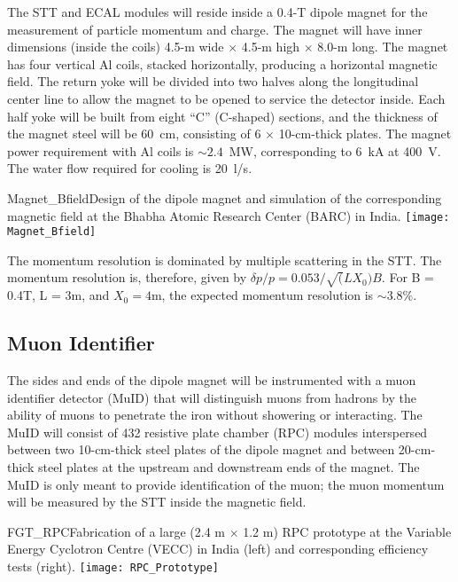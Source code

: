 The STT and ECAL modules will reside inside a 0.4-T dipole 
magnet for the measurement of particle momentum and charge. 
The magnet will have inner dimensions (inside the coils) 
4.5-m wide $\times$ 4.5-m high $\times$ 8.0-m long. The 
magnet has four vertical Al coils, stacked horizontally, producing a horizontal magnetic 
field. The return yoke will be divided into two halves along the 
longitudinal center line to allow the magnet to be opened to service the
detector inside. %
Each half yoke will be built
from eight ``C'' (C-shaped) sections, and the thickness of the 
magnet steel will be 60~cm, consisting of 6
$\times$ 10-cm-thick plates. The magnet power requirement with Al coils is $\sim 2.4$~MW,
corresponding to 6~kA at 400~V. The water flow required for cooling is 20~l/s.

\begin{cdrfigure}{Magnet_Bfield}{Design of the dipole magnet and simulation of the 
corresponding magnetic field at the Bhabha Atomic Research Center (BARC) in India.}  
\texttt{[image: Magnet\_Bfield]} %
\end{cdrfigure}

The momentum resolution is dominated by multiple scattering in the STT. The momentum resolution is, therefore, given by 
$\delta p/p = 0.053/\sqrt(LX_0)B$. For B = 0.4T, L = 3m, and $X_0 = 4$m, the
expected momentum resolution is $\sim 3.8\%$. 

\subsection{Muon Identifier}
\label{cdrsec:detectors-nd-ref-fgt-muonid}

The sides and ends of the dipole magnet will be instrumented
with a muon identifier
detector (MuID) that will distinguish muons from hadrons by the ability 
of muons to penetrate the iron without showering or interacting.
The MuID will consist of 432 resistive plate chamber (RPC) modules
interspersed between two 10-cm-thick steel plates of the 
dipole magnet and between 20-cm-thick steel plates at the upstream and
downstream ends of the magnet. 
The MuID is only meant to provide %
identification of the 
muon; the muon momentum %
will be measured by the STT inside the 
magnetic field.

\begin{cdrfigure}{FGT_RPC}{Fabrication of a large (2.4 m $\times$ 1.2 m) RPC prototype at 
the Variable Energy Cyclotron Centre (VECC) in India (left) and corresponding efficiency tests (right).}
\texttt{[image: RPC\_Prototype]} %
\end{cdrfigure}

